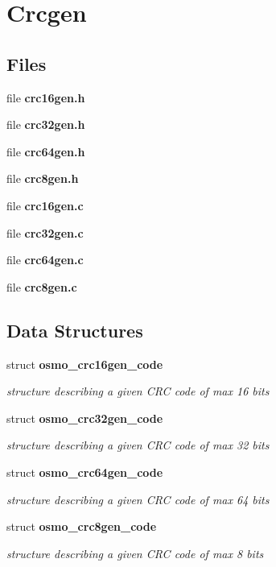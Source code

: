 \section{Crcgen}
\label{group__crcgen}
\subsection*{Files}
\begin{DoxyCompactItemize}
\item 
file {\bf crc16gen.\-h}
\item 
file {\bf crc32gen.\-h}
\item 
file {\bf crc64gen.\-h}
\item 
file {\bf crc8gen.\-h}
\item 
file {\bf crc16gen.\-c}
\item 
file {\bf crc32gen.\-c}
\item 
file {\bf crc64gen.\-c}
\item 
file {\bf crc8gen.\-c}
\end{DoxyCompactItemize}
\subsection*{Data Structures}
\begin{DoxyCompactItemize}
\item 
struct {\bf osmo\-\_\-crc16gen\-\_\-code}
\begin{DoxyCompactList}\small\item\em structure describing a given C\-R\-C code of max 16 bits \end{DoxyCompactList}\item 
struct {\bf osmo\-\_\-crc32gen\-\_\-code}
\begin{DoxyCompactList}\small\item\em structure describing a given C\-R\-C code of max 32 bits \end{DoxyCompactList}\item 
struct {\bf osmo\-\_\-crc64gen\-\_\-code}
\begin{DoxyCompactList}\small\item\em structure describing a given C\-R\-C code of max 64 bits \end{DoxyCompactList}\item 
struct {\bf osmo\-\_\-crc8gen\-\_\-code}
\begin{DoxyCompactList}\small\item\em structure describing a given C\-R\-C code of max 8 bits \end{DoxyCompactList}\end{DoxyCompactItemize}
